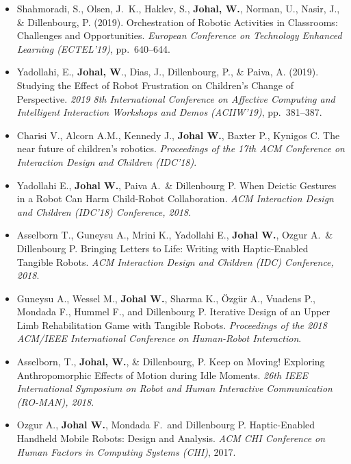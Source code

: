 \begin{itemize}[nosep]
    \item Shahmoradi, S., Olsen, J.\ K., Haklev, S., \textbf{Johal, W.}, Norman, U., Nasir, J., \& Dillenbourg, P. (2019). Orchestration of Robotic Activities in Classrooms: Challenges and Opportunities. \textit{European Conference on Technology Enhanced Learning (ECTEL'19)}, pp.\ 640--644.

    \item Yadollahi, E., \textbf{Johal, W}., Dias, J., Dillenbourg, P., \& Paiva, A. (2019). Studying the Effect of Robot Frustration on Children's Change of Perspective. \textit{2019 8th International Conference on Affective Computing and Intelligent Interaction Workshops and Demos (ACIIW'19)}, pp.\ 381--387.

    \item Charisi V., Alcorn A.M., Kennedy J., \textbf{Johal W.}, Baxter P., Kynigos C. The near future of children's robotics. \textit{Proceedings of the 17th ACM Conference on Interaction Design and Children (IDC'18)}.

    \item Yadollahi E., \textbf{Johal W.}, Paiva A.\ \& Dillenbourg P. When Deictic Gestures in a Robot Can Harm Child-Robot Collaboration. \textit{ACM Interaction Design and Children (IDC'18) Conference, 2018}. \faTrophy

    \item Asselborn T., Guneysu A., Mrini K., Yadollahi E., \textbf{Johal W.}, Ozgur A.\ \& Dillenbourg P. Bringing Letters to Life: Writing with Haptic-Enabled Tangible Robots. \textit{ACM Interaction Design and Children (IDC) Conference, 2018}.

    \item Guneysu A., Wessel M., \textbf{Johal W.}, Sharma K., Özgür A., Vuadens P., Mondada F., Hummel F., and Dillenbourg P. Iterative Design of an Upper Limb Rehabilitation Game with Tangible Robots. \textit{Proceedings of the 2018 ACM/IEEE International Conference on Human-Robot Interaction}.

    \item Asselborn, T., \textbf{Johal, W.}, \& Dillenbourg, P. Keep on Moving! Exploring Anthropomorphic Effects of Motion during Idle Moments. \textit{26th IEEE International Symposium on Robot and Human Interactive Communication (RO-MAN), 2018}.

    \item Ozgur A., \textbf{Johal W.}, Mondada F.\ and Dillenbourg P. Haptic-Enabled Handheld Mobile Robots: Design and Analysis. \textit{ACM CHI Conference on Human Factors in Computing Systems (CHI)}, 2017.


\end{itemize}
